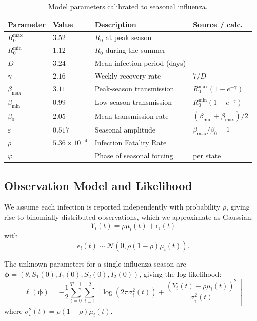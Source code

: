 \documentclass[9pt,twocolumn,twoside]{pnas-new}
\begin{document}
{\begin{table}[h]
\centering
\begin{tabular}{llll}
\toprule
Parameter & Value & Description & Source / calc.\\
\midrule
$R^{\text{max}}_0$ & 3.52 & $R_0$ at peak season & \citep{shaman2010} \\
$R^{\text{min}}_0$ & 1.12 & $R_0$ during the summer & \citep{shaman2010} \\
$D$ & 3.24 & Mean infection period (days) & \citep{shaman2010} \\
$\gamma$ & $2.16$ & Weekly recovery rate & $7 / D$ \\
$\beta_{\text{max}}$ & $3.11$ & Peak-season transmission & $R_0^{\text{max}}(1 - e^{-\gamma})$\\
$\beta_{\text{min}}$ & $0.99$ & Low-season transmission & $R_0^{\text{min}}(1 - e^{-\gamma})$ \\
$\beta_0$ & $2.05$ & Mean transmission rate & $(\beta_{\text{min}} + \beta_{\text{max}})/2$ \\
$\varepsilon$ & $0.517$ & Seasonal amplitude & $\beta_{\text{max}} / \beta_0 - 1$\\
$\rho$ & $5.36 \times 10^{-4}$ & Infection Fatality Rate & \citep{rolfes2018}\\
$\varphi$ & & Phase of seasonal forcing & per state \\
\bottomrule
\end{tabular}
\caption{Model parameters calibrated to seasonal influenza.}
\label{tab:params}
\end{table}

\subsection*{Observation Model and Likelihood}\label{subsec:noise}
We assume each infection is reported independently with probability
$\rho$, giving rise to binomially distributed observations, which we approximate as Gaussian:
%
%
$$
Y_i(t) = \rho\mu_i(t) + \epsilon_i(t)
$$
%
%
with
%
%
$$
\epsilon_i(t) \sim \mathcal{N}(0, \rho(1{-}\rho)\mu_i(t)).
$$
%
%

The unknown parameters for a single influenza season are
$\boldsymbol{\phi} = (\theta, S_1(0), I_1(0), S_2(0), I_2(0))$, giving
the log-likelihood:
\begin{equation}\label{eq:loglik}
\ell(\boldsymbol{\phi}) = -\frac{1}{2}\sum_{t=0}^{T-1}\sum_{i=1}^{2}
\left[\log(2\pi \sigma_i^2(t)) + \frac{(Y_i(t) -
    \rho\mu_i(t))^2}{\sigma_i^2(t)}\right]
\end{equation}
where $\sigma_i^2(t) = \rho(1{-}\rho)\mu_i(t)$.

}
\end{document}
